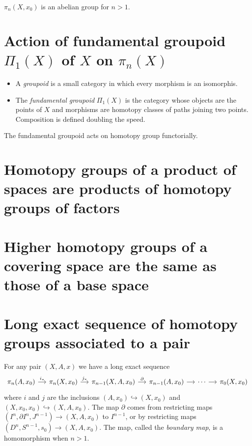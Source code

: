 \begin{proposition}
\label{proposition-commutativity-of-higher-homotopy-groups}
$\pi_n(X,x_0)$ is an abelian group for $n>1$.
\end{proposition}

\section{Action of fundamental groupoid 
\texorpdfstring{$\Pi_1(X)$}{Π₁(X)} of 
\texorpdfstring{$X$}{X} on \texorpdfstring{$\pi_{n}(X)$}{π₁(X)}}
\label{section-action-of-fundamental-groupoid}

\begin{itemize}
\item A {\it groupoid} is a small category in 
which every morphism is an isomorphis.
\item The {\it fundamental groupoid} $\Pi_{1}(X)$ 
is the category whose objects 
are the points of  $X$ and 
morphisms are homotopy classes of paths joining two points.
Composition is defined doubling the speed.
\end{itemize}

The fundamental groupoid acts on homotopy group functorially.

\section{Homotopy groups of a product of spaces 
are products of homotopy groups of factors}

\section{Higher homotopy groups of a covering space 
are the same as those of a base space}

\section{Long exact sequence of homotopy groups associated to a pair}
\label{section-long-exact-sequence-of-homotopy-groups}

For any pair $(X,A,x)$ we have a long exact sequence
$$\begin{tikzcd}[column sep=small]
	\pi_n(A,x_0)\arrow[r,"i_*"]&\pi_{n}(X,x_0)\arrow[r,"j_*"]&\pi_{n-1}(X,A,x_0)\arrow[r,"\partial"]&\pi_{n-1}(A,x_0)\arrow[r]&\cdots\arrow[r]&\pi_0(X,x_0)
\end{tikzcd}$$
where $i$ and $j$ are the inclusions $(A,x_0)\hookrightarrow(X,x_0)$ and $(X,x_0,x_0)\hookrightarrow(X,A,x_0)$. The map $\partial$ comes from restricting maps $(I^n,\partial I^n,J^{n-1})\to (X,A,x_0)$ to $I^{n-1}$, or by restricting maps $(D^n,S^{n-1},s_0)\to (X,A,x_0)$. The map, called the {\it boundary map}, is a homomorphism when $n>1$.

